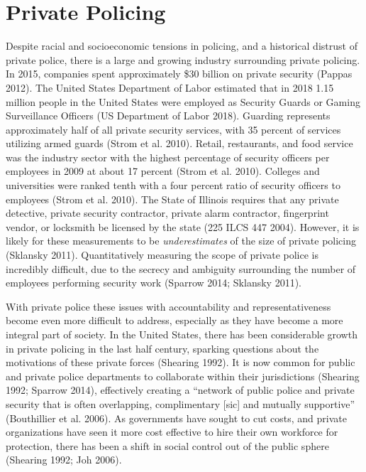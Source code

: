 \documentclass{ucetd}
\begin{document}
\hypertarget{private-policing}{%
\section{Private Policing}\label{private-policing}}

Despite racial and socioeconomic tensions in policing, and a historical
distrust of private police, there is a large and growing industry
surrounding private policing. In 2015, companies spent approximately
\$30 billion on private security (Pappas 2012). The United States
Department of Labor estimated that in 2018 1.15 million people in the
United States were employed as Security Guards or Gaming Surveillance
Officers (US Department of Labor 2018). Guarding represents
approximately half of all private security services, with 35 percent of
services utilizing armed guards (Strom et al. 2010). Retail,
restaurants, and food service was the industry sector with the highest
percentage of security officers per employees in 2009 at about 17
percent (Strom et al. 2010). Colleges and universities were ranked tenth
with a four percent ratio of security officers to employees (Strom et
al. 2010). The State of Illinois requires that any private detective,
private security contractor, private alarm contractor, fingerprint
vendor, or locksmith be licensed by the state (225 ILCS 447 2004).
However, it is likely for these measurements to be \emph{underestimates}
of the size of private policing (Sklansky 2011). Quantitatively
measuring the scope of private police is incredibly difficult, due to
the secrecy and ambiguity surrounding the number of employees performing
security work (Sparrow 2014; Sklansky 2011).

With private police these issues with accountability and
representativeness become even more difficult to address, especially as
they have become a more integral part of society. In the United States,
there has been considerable growth in private policing in the last half
century, sparking questions about the motivations of these private
forces (Shearing 1992). It is now common for public and private police
departments to collaborate within their jurisdictions (Shearing 1992;
Sparrow 2014), effectively creating a ``network of public police and
private security that is often overlapping, complimentary {[}sic{]} and
mutually supportive'' (Bouthillier et al. 2006). As governments have
sought to cut costs, and private organizations have seen it more cost
effective to hire their own workforce for protection, there has been a
shift in social control out of the public sphere (Shearing 1992; Joh
2006).
\end{document}
